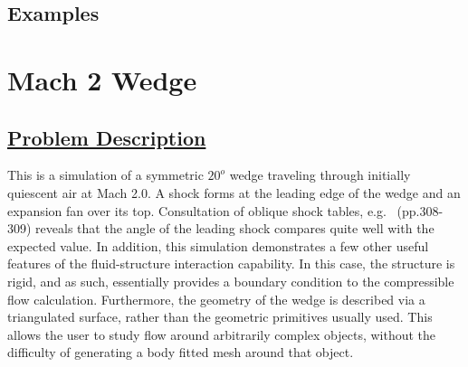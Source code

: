 

\subsection{Examples}

\section*{\center Mach 2 Wedge}
\subsection*{\underline{Problem Description}}
This is a simulation of a symmetric $20^o$ wedge traveling through initially
quiescent air at Mach 2.0.  A shock forms at the leading edge of the
wedge and an expansion fan over its top.  Consultation of oblique shock
tables, e.g.~\cite{ref:Saad} (pp.308-309) reveals that the angle of the leading
shock compares quite well with the expected value.  In addition, this
simulation demonstrates a few other useful features of the fluid-structure
interaction capability.  In this case, the structure is rigid, and as
such, essentially provides a boundary condition to the compressible flow
calculation.  Furthermore, the geometry of the wedge is described via a
triangulated surface, rather than the geometric primitives usually used.
This allows the user to study flow around arbitrarily complex objects,
without the difficulty of generating a body fitted mesh around that object.

